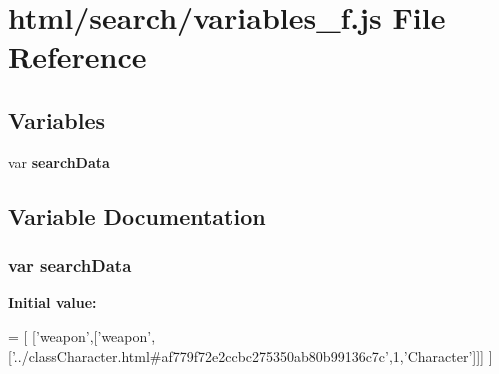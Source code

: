 \section{html/search/variables\-\_\-f.js File Reference}
\label{variables__f_8js}
\subsection*{Variables}
\begin{DoxyCompactItemize}
\item 
var {\bf search\-Data}
\end{DoxyCompactItemize}


\subsection{Variable Documentation}
\subsubsection[{search\-Data}]{\setlength{\rightskip}{0pt plus 5cm}var search\-Data}\label{variables__f_8js_ad01a7523f103d6242ef9b0451861231e}
{\bfseries Initial value\-:}
\begin{DoxyCode}
=
[
  [\textcolor{stringliteral}{'weapon'},[\textcolor{stringliteral}{'weapon'},[\textcolor{stringliteral}{'../classCharacter.html#af779f72e2ccbc275350ab80b99136c7c'},1,\textcolor{stringliteral}{'Character'}]]]
]
\end{DoxyCode}
